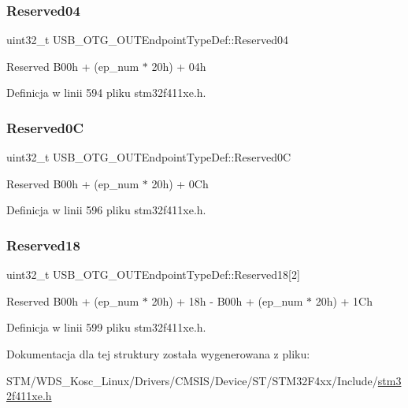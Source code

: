\subsubsection{\texorpdfstring{Reserved04}{Reserved04}}
{\footnotesize\ttfamily uint32\+\_\+t U\+S\+B\+\_\+\+O\+T\+G\+\_\+\+O\+U\+T\+Endpoint\+Type\+Def\+::\+Reserved04}

Reserved B00h + (ep\+\_\+num $\ast$ 20h) + 04h 

Definicja w linii 594 pliku stm32f411xe.\+h.

\mbox{\label{struct_u_s_b___o_t_g___o_u_t_endpoint_type_def_a1d7bc9b546c4dd8ce2fe792945cf7a9d}} 
\subsubsection{\texorpdfstring{Reserved0C}{Reserved0C}}
{\footnotesize\ttfamily uint32\+\_\+t U\+S\+B\+\_\+\+O\+T\+G\+\_\+\+O\+U\+T\+Endpoint\+Type\+Def\+::\+Reserved0C}

Reserved B00h + (ep\+\_\+num $\ast$ 20h) + 0\+Ch 

Definicja w linii 596 pliku stm32f411xe.\+h.

\mbox{\label{struct_u_s_b___o_t_g___o_u_t_endpoint_type_def_a51b162457add1bb7cc254b7aeb9f94bd}} 
\subsubsection{\texorpdfstring{Reserved18}{Reserved18}}
{\footnotesize\ttfamily uint32\+\_\+t U\+S\+B\+\_\+\+O\+T\+G\+\_\+\+O\+U\+T\+Endpoint\+Type\+Def\+::\+Reserved18\mbox{[}2\mbox{]}}

Reserved B00h + (ep\+\_\+num $\ast$ 20h) + 18h -\/ B00h + (ep\+\_\+num $\ast$ 20h) + 1\+Ch 

Definicja w linii 599 pliku stm32f411xe.\+h.



Dokumentacja dla tej struktury została wygenerowana z pliku\+:\begin{DoxyCompactItemize}
\item 
S\+T\+M/\+W\+D\+S\+\_\+\+Kosc\+\_\+\+Linux/\+Drivers/\+C\+M\+S\+I\+S/\+Device/\+S\+T/\+S\+T\+M32\+F4xx/\+Include/\hyperlink{stm32f411xe_8h}{stm32f411xe.\+h}\end{DoxyCompactItemize}
